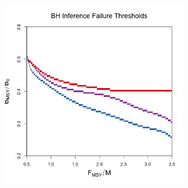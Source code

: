 \documentclass[a0paper,portrait]{baposter}
\begin{document}
\begin{poster}
{\begin{minipage}[h!]{0.25\textwidth}
        \end{minipage}
        \begin{minipage}[h!]{0.75\textwidth}
        \includegraphics[width=0.6\textwidth]{../../ddBias/relErrorImagesBHDD0.5.png}
	\end{minipage}
}

%

%
\headerbox{References}{name=ref,column=0,below=results,span=3}{
	{\renewcommand{\markboth}[2]{}}%

}
\end{poster}
\end{document}
